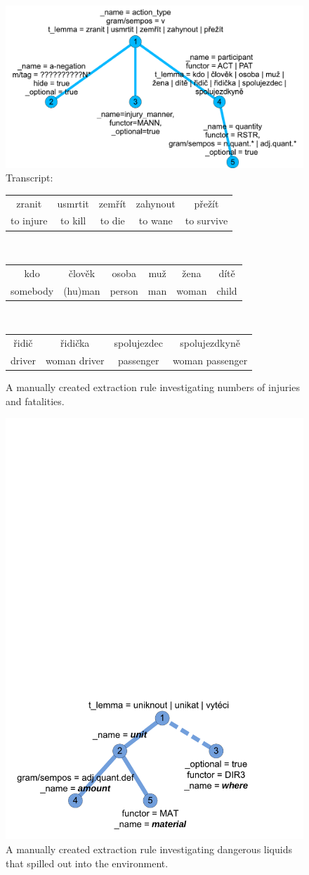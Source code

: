 \begin{figure}
	\centering
		\includegraphics[width=0.5\hsize]{../img/ch3_extract_patern}		
\\Transcript:\\
\begin{tabular}{|c|c|c|c|c|}
\hline
zranit & usmrtit & zemřít & zahynout & přežít\\
to injure & to kill & to die & to wane & to survive\\
\hline
\end{tabular}
\\\begin{tabular}{|c|c|c|c|c|c|}
\hline
kdo & člověk & osoba & muž & žena & dítě\\
somebody & (hu)man & person & man & woman & child\\
\hline
\end{tabular}
\\\begin{tabular}{|c|c|c|c|}
\hline
řidič & řidička & spolujezdec & spolujezdkyně\\
driver & woman driver & passenger & woman passenger\\	
\hline
\end{tabular}		
	\caption{A manually created extraction rule investigating numbers of injuries and fatalities.}
	\label{fig:ch3_extract_patern}
\end{figure}

\begin{figure}
	\centering
		\includegraphics[width=0.5\hsize]{../img/ch3_eenv_extract_patern}
	\caption{A manually created extraction rule investigating dangerous liquids that spilled out into the environment.}
	\label{fig:ch3_eenv_extract_patern}
\end{figure}


